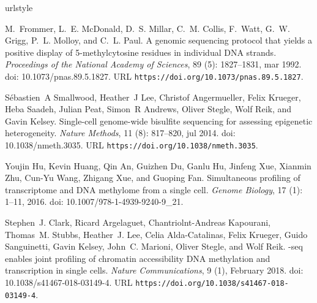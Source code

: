 \documentclass[10pt]{article}
\begin{document}
\begin{thebibliography}{31}
	\providecommand{\natexlab}[1]{#1}
	\providecommand{\url}[1]{\texttt{#1}}
	\expandafter\ifx\csname urlstyle\endcsname\relax
	\providecommand{\doi}[1]{doi: #1}\else
	\providecommand{\doi}{doi: \begingroup \urlstyle{rm}\Url}\fi
	
	M.~Frommer, L.~E. McDonald, D.~S. Millar, C.~M. Collis, F.~Watt, G.~W. Grigg,
	P.~L. Molloy, and C.~L. Paul.
	\newblock A genomic sequencing protocol that yields a positive display of
	5-methylcytosine residues in individual {DNA} strands.
	\newblock \emph{Proceedings of the National Academy of Sciences}, 89
	(5): 1827--1831, mar 1992.
	\newblock \doi{10.1073/pnas.89.5.1827}.
	\newblock URL \url{https://doi.org/10.1073/pnas.89.5.1827}.
	
	S{\'{e}}bastien~A Smallwood, Heather~J Lee, Christof Angermueller, Felix
	Krueger, Heba Saadeh, Julian Peat, Simon~R Andrews, Oliver Stegle, Wolf Reik,
	and Gavin Kelsey.
	\newblock Single-cell genome-wide bisulfite sequencing for assessing epigenetic
	heterogeneity.
	\newblock \emph{Nature Methods}, 11 (8): 817--820, jul 2014.
	\newblock \doi{10.1038/nmeth.3035}.
	\newblock URL \url{https://doi.org/10.1038/nmeth.3035}.
	
	Youjin Hu, Kevin Huang, Qin An, Guizhen Du, Ganlu Hu, Jinfeng Xue, Xianmin Zhu,
	Cun-Yu Wang, Zhigang Xue, and Guoping Fan.
	\newblock Simultaneous profiling of transcriptome and {DNA} methylome from a
	single cell.
	\newblock \emph{Genome Biology}, 17 (1): 1--11, 2016.
	\newblock \doi{10.1007/978-1-4939-9240-9_21}.
	
	Stephen~J. Clark, Ricard Argelaguet, Chantriolnt-Andreas Kapourani, Thomas~M.
	Stubbs, Heather~J. Lee, Celia Alda-Catalinas, Felix Krueger, Guido
	Sanguinetti, Gavin Kelsey, John~C. Marioni, Oliver Stegle, and Wolf Reik.
	-seq enables joint profiling of chromatin accessibility {DNA}
	methylation and transcription in single cells.
	\newblock \emph{Nature Communications}, 9 (1), February 2018.
	\newblock \doi{10.1038/s41467-018-03149-4}.
	\newblock URL \url{https://doi.org/10.1038/s41467-018-03149-4}.
	

\end{thebibliography}
\end{document}

